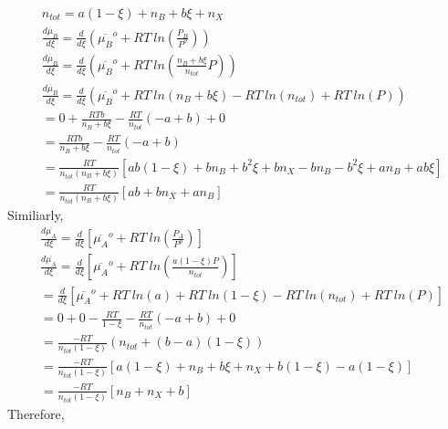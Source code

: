 \documentclass[a4paper,fleqn]{article}
\begin{document}
	\begin{equation*}
	\begin{split}
	&n_{tot} = a(1 - \xi) + n_B + b \xi + n_X\\
	&\frac{d\overline{\mu}_B}{d\xi} = \frac{d}{d\xi}\left( \overline{\mu_B}^o + R T ~ln\left( \frac{P_B}{P^o}\right)\right)\\
	&\frac{d\overline{\mu}_B}{d\xi} = \frac{d}{d\xi}\left( \overline{\mu_B}^o + R T ~ln\left( \frac{n_B + b \xi}{n_{tot}}P\right)\right)\\
	&\frac{d\overline{\mu}_B}{d\xi} = \frac{d}{d\xi}\left( \overline{\mu_B}^o + R T ~ln(n_B + b \xi) - RT ~ln(n_{tot}) + RT~ln(P)\right)\\
	&= 0 + \frac{RTb}{n_B + b\xi} - \frac{RT}{n_{tot}}(-a + b) + 0\\
	&= \frac{RTb}{n_B + b\xi} - \frac{RT}{n_{tot}}(-a + b)\\
	&=\frac{RT}{n_{tot}(n_B + b\xi)} \left[ ab(1-\xi) + b n_B + b^2\xi + bn_X - bn_B - b^2\xi + an_B + ab\xi \right]\\
	&=\frac{RT}{n_{tot}(n_B + b\xi)}\left[ ab + bn_X + an_B \right]
	\end{split}	
	\end{equation*}
	Similiarly,
	\begin{equation*}
	\begin{split}
	&\frac{d\overline{\mu_A}}{d\xi} = \frac{d}{d\xi} \left[ \overline{\mu_A}^o + RT ~ln\left( \frac{P_A}{P^o}\right) \right]\\
	&\frac{d\overline{\mu_A}}{d\xi} = \frac{d}{d\xi} \left[ \overline{\mu_A}^o + RT ~ln\left( \frac{a(1 - \xi)P}{n_{tot}}\right) \right]\\
									&= \frac{d}{d\xi} \left[ \overline{\mu_A}^o + RT~ln(a) + RT~ln(1-\xi) - RT~ln(n_{tot}) + RT~ln(P) \right]\\
									&= 0 + 0 - \frac{RT}{1 - \xi} - \frac{RT}{n_{tot}}(-a + b) + 0\\
									&= \frac{-RT}{n_{tot}(1 - \xi)} (n_{tot} + (b-a)(1 - \xi))\\
									&= \frac{-RT}{n_{tot}(1 - \xi)} \left[ a(1-\xi) + n_B + b\xi + n_X + b(1-\xi) - a(1-\xi) \right]\\
									&= \frac{-RT}{n_{tot}(1 - \xi)} \left[ n_B + n_X + b \right]
	\end{split}	
	\end{equation*}
	Therefore,
\end{document}
